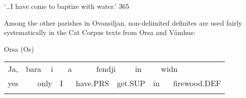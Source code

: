 \begin{styleTranslation}
‘…I have come to baptize with water.’ 365

\end{styleTranslation}

\begin{styleBodytextC}
Among the other parishes in Ovansiljan, non-delimited definites are used fairly systematically in the Cat Corpus texts from Orsa and Våmhus: 

\end{styleBodytextC}


\begin{listWWNumileveli}
\item 

\end{listWWNumileveli}

\begin{listWWNumxxixleveli}
\item 

\begin{styleExLtrTbl}
Orsa (Os)

\end{styleExLtrTbl}

\end{listWWNumxxixleveli}

\begin{tabular}{llllllllllllll}
\lsptoprule
Ja, & \multicolumn{2}{l}{bara

} & \multicolumn{2}{l}{i

} & \multicolumn{2}{l}{a

} & \multicolumn{2}{l}{fendji

} & \multicolumn{2}{l}{in

} & \multicolumn{2}{l}{widn

} & \\
\multicolumn{2}{l}{yes

} & \multicolumn{2}{l}{only

} & \multicolumn{2}{l}{I

} & \multicolumn{2}{l}{have.PRS

} & \multicolumn{2}{l}{get.SUP

} & \multicolumn{2}{l}{in

} & \multicolumn{2}{l}{firewood.DEF

}\\
\lspbottomrule
\end{tabular}

